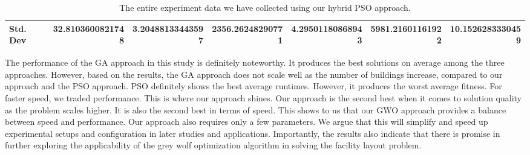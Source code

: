 \begin{table}
\begin{adjustwidth}{}{}
{{\begin{tabular}{|r|r|r|r|r|r|r|}
	\hline
	\multicolumn{1}{|l|}{Std. Dev}             & 32.8103600821748             & 3.20488133443597                      & 2356.26248290771               & 4.29501180868943                      & 5981.21601161922             & 10.1526283330459                       \\
	\hline
\end{tabular}}}
\end{adjustwidth}
\caption{The entire experiment data we have collected using our hybrid PSO approach.}
\label{full-data-pso}
\end{table}

The performance of the GA approach in this study is definitely noteworthy. It produces the best solutions on average among the three approaches. However, based on the results, the GA approach does not scale well as the number of buildings increase, compared to our approach and the PSO approach. PSO definitely shows the best average runtimes. However, it produces the worst average fitness. For faster speed, we traded performance. This is where our approach shines. Our approach is the second best when it comes to solution quality as the problem scales higher. It is also the second best in terms of speed. This shows to us that our GWO approach provides a balance between speed and performance. Our approach also requires only a few parameters. We argue that this will simplify and speed up experimental setups and configuration in later studies and applications. Importantly, the results also indicate that there is promise in further exploring the applicability of the grey wolf optimization algorithm in solving the facility layout problem.

